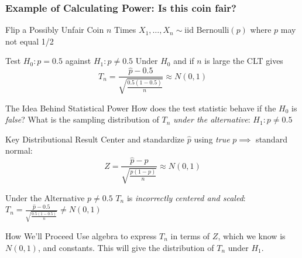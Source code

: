 \documentclass[handout]{beamer}
\begin{document}
\begin{frame}
\frametitle{Example of Calculating Power: Is this coin fair?}

\begin{block}
{Flip a Possibly Unfair Coin $n$ Times}
$X_1, \hdots, X_n \sim \mbox{iid Bernoulli}(p)$ where $p$ may not equal 1/2
\end{block}

\begin{block}
	{Test $H_0\colon p = 0.5$ against $H_1\colon p \neq 0.5$}
	Under $H_0$ and if $n$ is large the CLT gives 
	$$\displaystyle T_n = \frac{\widehat{p} - 0.5}{\sqrt{\frac{0.5(1-0.5)}{n}}}\approx N(0,1)$$
\end{block}

\begin{alertblock}
	{The Idea Behind Statistical Power}
	How does the test statistic behave if the  $H_0$ is \emph{false}? What is the sampling distribution of $T_n$ \emph{under the alternative}: $H_1\colon p\neq 0.5$
\end{alertblock}

\end{frame}
\begin{frame}

\begin{block}
	{Key Distributional Result}
	Center and standardize $\widehat{p}$ using \emph{true} $p \implies$ standard normal:
	$$Z = \frac{\widehat{p} - p}{\sqrt{\frac{p(1-p)}{n}}}  \approx N(0,1)$$
\end{block}

\begin{block}
	{Under the Alternative $p\neq 0.5$}
	$T_n$ is \emph{incorrectly centered and scaled}: $\displaystyle T_n = \frac{\widehat{p} - 0.5}{\sqrt{\frac{0.5(1-0.5)}{n}}} \neq N(0,1)$
\end{block}

\begin{alertblock}
	{How We'll Proceed}
	Use algebra to express $T_n$ in terms of $Z$, which we know is $N(0,1)$, and constants. This will give the distribution of $T_n$ under $H_1$.
\end{alertblock}
\end{frame}
\end{document}
